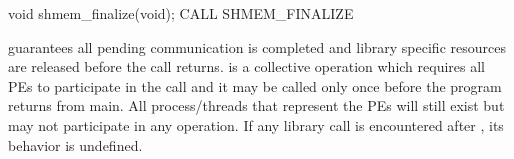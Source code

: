 \synC
void shmem_finalize(void); %
\synF
CALL SHMEM_FINALIZE %


{
        guarantees all pending communication is completed and  \openshmem library specific resources are released before the call returns.  is a collective operation which requires all \acp{PE} to participate in the call and it may be called only once before the program returns from main. All process/threads that represent the PEs will still exist but may not participate in any  \openshmem operation. If any  \openshmem library call is encountered after  , its behavior is undefined.
 }
{
}

\eAPI

